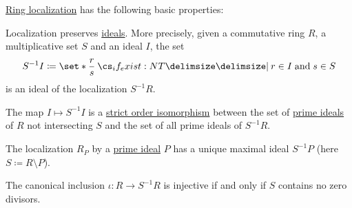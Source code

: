 \begin{proposition}\label{thm:def:ring_localization}
  \hyperref[def:ring_localization]{Ring localization} has the following basic properties:

  \begin{thmenum}
     Localization preserves \hyperref[def:semiring_ideal]{ideals}. More precisely, given a commutative ring \( R \), a multiplicative set \( S \) and an ideal \( I \), the set
    \begin{equation*}
      S^{-1} I \coloneqq \set*{ \frac r s \given* r \in I \T{and} s \in S }
    \end{equation*}
    is an ideal of the localization \( S^{-1} R \).

     The map \( I \mapsto S^{-1} I \) is a \hyperref[def:order_homomorphism/isomorphism]{strict order isomorphism} between the set of \hyperref[def:ring/submodel]{prime ideals} of \( R \) not intersecting \( S \) and the set of all prime ideals of \( S^{-1} R \).

     The localization \( R_P \) by a \hyperref[def:semiring_ideal/prime]{prime ideal} \( P \) has a unique maximal ideal \( S^{-1} P \) (here \( S \coloneqq R \setminus P \)).

     The canonical inclusion \( \iota: R \to S^{-1} R \) is injective if and only if \( S \) contains no zero divisors.
  \end{thmenum}
\end{proposition}
